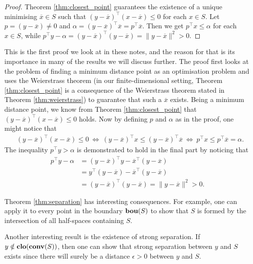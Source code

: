 %
\begin{proof}
	Theorem \ref{thm:closest_point} guarantees the existence of a unique minimising $\overline{x} \in S$ such that $(y-\overline{x})^\top(x - \overline{x}) \leq 0$ for each $x \in S$. Let $p = (y - \overline{x}) \neq 0$ and $\alpha = (y - \overline{x})^\top\overline{x} = p^\top\overline{x}$. Then we get $p^\top x \leq \alpha$ for each $x \in S$, while $p^\top y - \alpha = (y - \overline{x})^\top(y - \overline{x}) = \|y - \overline{x}\|^2 > 0$.
\end{proof}

This is the first proof we look at in these notes, and the reason for that is its importance in many of the results we will discuss further. The proof first looks at the problem of finding a minimum distance point as an optimisation problem and uses the Weierstrass theorem (in our finite-dimensional setting, Theorem \ref{thm:closest_point} is a consequence of the Weierstrass theorem stated in Theorem \ref{thm:weierstrass}) to guarantee that such a $\overline{x}$ exists. Being a minimum distance point, we know from Theorem \ref{thm:closest_point} that $(y-\overline{x})^\top(x - \overline{x}) \leq 0$ holds. Now by defining $p$ and $\alpha$ as in the proof, one might notice that
%
\begin{align*}
	& (y-\overline{x})^\top(x - \overline{x}) \leq 0 \ \Leftrightarrow \ 
	(y-\overline{x})^\top x \leq (y - \overline{x})^\top\overline{x} \ \Leftrightarrow \ 
	p^\top x \leq p^\top\overline{x} = \alpha. 
\end{align*}
%
The inequality $p^\top y > \alpha$ is demonstrated to hold in the final part by noticing that 
%
\begin{align*}
	p^\top y - \alpha &= 
	(y - \overline{x})^\top y - \overline{x}^\top(y - \overline{x}) \\ &= 
	y^\top(y - \overline{x}) - \overline{x}^\top(y - \overline{x}) \\ & = (y - \overline{x})^\top (y - \overline{x}) = \| y - \overline{x} \|^2 > 0.
\end{align*}

Theorem \ref{thm:separation} has interesting consequences. For example, one can apply it to every point in the boundary $\mathop{\bf bou}(S)$ to show that $S$ is formed by the intersection of all half-spaces containing $S$. 

Another interesting result is the existence of strong separation. If $y \notin \mathop{\bf clo}(\mathop{\bf conv}(S))$, then one can show that strong separation between $y$ and $S$ exists since there will surely be a distance $\epsilon>0$ between $y$ and $S$. 


